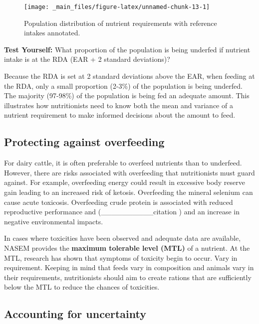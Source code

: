 \documentclass[
]{book}
\begin{document}
\begin{figure}

{\centering \texttt{[image: \_main\_files/figure-latex/unnamed-chunk-13-1]} 

}

\caption{Population distribution of nutrient requirements with reference intakes annotated.}\label{fig:unnamed-chunk-13}
\end{figure}

\textbf{Test Yourself: }
What proportion of the population is being underfed if nutrient intake is at the RDA (EAR + 2 standard deviations)?

Because the RDA is set at 2 standard deviations above the EAR, when feeding at the RDA, only a small proportion (2-3\%) of the population is being underfed. The majority (97-98\%) of the population is being fed an adequate amount. This illustrates how nutritionists need to know both the mean and variance of a nutrient requirement to make informed decisions about the amount to feed.

\hypertarget{protecting-against-overfeeding}{%
\subsection{Protecting against overfeeding}\label{protecting-against-overfeeding}}

For dairy cattle, it is often preferable to overfeed nutrients than to underfeed. However, there are risks associated with overfeeding that nutritionists must guard against. For example, overfeeding energy could result in excessive body reserve gain leading to an increased risk of ketosis. Overfeeding the mineral selenium can cause acute toxicosis. Overfeeding crude protein is associated with reduced reproductive performance and (\_\_\_\_\_\_\_\_\_\_citation ) and an increase in negative environmental impacts.

In cases where toxicities have been observed and adequate data are available, NASEM \citeyearpar{NASEM8} provides the \textbf{maximum tolerable level (MTL)} of a nutrient. At the MTL, research has shown that symptoms of toxicity begin to occur.
Vary in requirement. Keeping in mind that feeds vary in composition and animals vary in their requirements, nutritionists should aim to create rations that are sufficiently below the MTL to reduce the chances of toxicities.

\hypertarget{accounting-for-uncertainty}{%
\subsection{Accounting for uncertainty}\label{accounting-for-uncertainty}}
\end{document}
